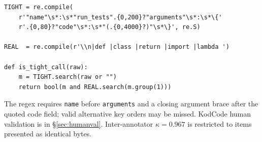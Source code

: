 {\footnotesize
\begin{verbatim}
TIGHT = re.compile(
    r'"name"\s*:\s*"run_tests".{0,200}?"arguments"\s*:\s*\{'
    r'.{0,80}?"code"\s*:\s*"(.{0,4000}?)"\s*\}', re.S)

REAL  = re.compile(r'\\n|def |class |return |import |lambda ')

def is_tight_call(raw):
    m = TIGHT.search(raw or "")
    return bool(m and REAL.search(m.group(1)))
\end{verbatim}
}

The regex requires \texttt{name} before \texttt{arguments} and a closing argument brace
after the quoted code field; valid alternative key orders may be missed.
KodCode human validation is in \S\ref{sec:humanval}. Inter-annotator $\kappa=0.967$
is restricted to items presented as identical bytes.
